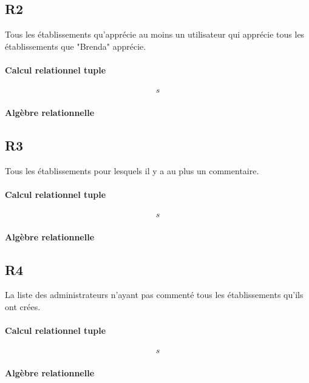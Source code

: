 \documentclass[11pt,a4paper]{report}
\begin{document}
\subsection*{R2}
\noindent Tous les établissements qu’apprécie au moins un utilisateur qui apprécie tous les établissements que "Brenda" apprécie.
\paragraph*{Calcul relationnel tuple}
\begin{align*}
s
\end{align*}
\paragraph*{Algèbre relationnelle}
\subsection*{R3}
Tous les établissements pour lesquels il y a au plus un commentaire.
\paragraph*{Calcul relationnel tuple}
\begin{align*}
s
\end{align*}
\paragraph*{Algèbre relationnelle}
\subsection*{R4}
La liste des administrateurs n’ayant pas commenté tous les établissements qu’ils ont crées.
\paragraph*{Calcul relationnel tuple}
\begin{align*}
s
\end{align*}
\paragraph*{Algèbre relationnelle}
\end{document}

